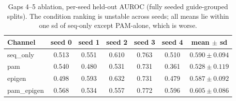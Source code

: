 \begin{table}[h]\centering\small\caption{Gaps 4--5 ablation, per-seed held-out AUROC (fully seeded guide-grouped splits). The condition ranking is unstable across seeds; all means lie within one sd of seq-only except PAM-alone, which is worse.}\label{tab:ablperseed}
\begin{tabular}{lcccccc}\hline
Channel & seed 0 & seed 1 & seed 2 & seed 3 & seed 4 & mean $\pm$ sd \\\hline
seq\_only & 0.513 & 0.551 & 0.610 & 0.763 & 0.510 & $0.590 \pm 0.094$ \\
pam & 0.540 & 0.480 & 0.531 & 0.731 & 0.361 & $0.528 \pm 0.119$ \\
epigen & 0.498 & 0.593 & 0.632 & 0.731 & 0.479 & $0.587 \pm 0.092$ \\
pam\_epigen & 0.568 & 0.534 & 0.557 & 0.772 & 0.596 & $0.605 \pm 0.086$ \\
\hline\end{tabular}\end{table}
